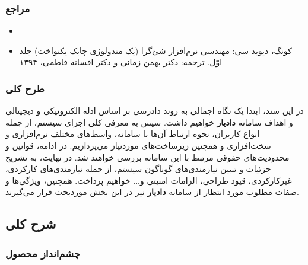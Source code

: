 \documentclass[12pt,a4paper,oneside]{article}
\begin{document}
			\subsubsection{مراجع}

			\begin{itemize}
				\item 
				
				\item 
				کونگ، دیوید سی: مهندسی نرم‌افزار شئ‌گرا (یک متدولوژی چابک یکنواخت) جلد اوّل. ترجمه: دکتر بهمن زمانی و دکتر افسانه فاطمی، ۱۳۹۴
			
			\end{itemize}

			\subsubsection{طرح کلی}
			در این سند، ابتدا یک نگاه اجمالی به روند دادرسی بر اساس ادله الکترونیکی و دیجیتالی و اهداف سامانه \textbf{دادیار} خواهیم داشت. سپس به معرفی کلی اجزای سیستم، از جمله انواع کاربران، نحوه ارتباط آن‌ها با سامانه، واسط‌های مختلف نرم‌افزاری و سخت‌افزاری و همچنین زیرساخت‌های موردنیاز می‌پردازیم. در ادامه، قوانین و محدودیت‌های حقوقی مرتبط با این سامانه بررسی خواهند شد. در نهایت، به تشریح جزئیات و تبیین نیازمندی‌های گوناگون سیستم، از جمله نیازمندی‌های کارکردی، غیرکارکردی، قیود طراحی، الزامات امنیتی و... خواهیم پرداخت. همچنین، ویژگی‌ها و صفات مطلوب مورد انتظار از سامانه \textbf{دادیار} نیز در این بخش موردبحث قرار می‌گیرند.

	\subsection{شرح کلی}

	\subsubsection{چشم‌انداز محصول}
			
\end{document}
